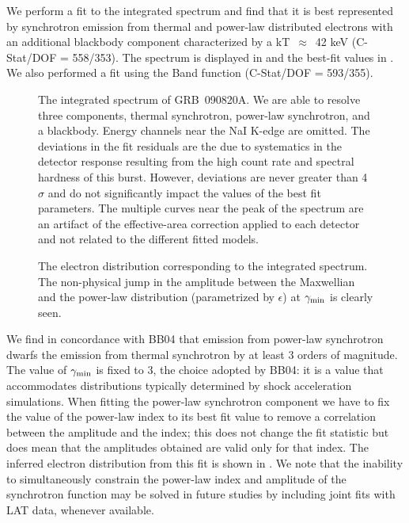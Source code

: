 We perform a fit to the integrated spectrum and find that it is best
represented by synchrotron emission from thermal and power-law
distributed electrons with an additional blackbody component
characterized by a kT~$\approx$~42 keV (C-Stat/DOF = 558/353). The
 spectrum is displayed in 
and the best-fit values in . We also performed
a fit using the Band function (C-Stat/DOF = 593/355).
\begin{figure}[h]
\caption{The integrated
  spectrum of GRB~090820A. We are able to resolve three
  components, thermal synchrotron, power-law synchrotron, and a
  blackbody. Energy channels near the NaI K-edge are omitted. The
  deviations in the fit residuals are the due to systematics in the
  detector response resulting from the high count rate and spectral
  hardness of this burst. However, deviations are never greater than
  4$\sigma$ and do not significantly impact the values of the best fit
  parameters. The multiple curves near the peak of the spectrum are an
  artifact of the effective-area correction applied to each detector
  and not related to the different fitted models.}
\label{fig:figure2}
\end{figure}



\begin{figure}
\label{fig:figure3}
\caption{The electron distribution corresponding to the integrated spectrum. The non-physical jump in the amplitude between the Maxwellian and the power-law distribution (parametrized by $\epsilon$) at $\gamma_{\rm min}$ is clearly seen.}
\end{figure}



We find in concordance with BB04 that emission from power-law
synchrotron dwarfs the emission from thermal synchrotron by at least 3
orders of magnitude. The value of $\gamma_{\rm min}$ is fixed to 3, the
choice adopted by BB04: it is a value that accommodates distributions
typically determined by shock acceleration simulations.  When fitting
the power-law synchrotron component we have to fix the value of the
power-law index to its best fit value to remove a correlation between
the amplitude and the index; this does not change the fit statistic
but does mean that the amplitudes obtained are valid only for that
index. The inferred electron distribution from this fit is shown in
. We note that the inability to simultaneously
constrain the power-law index and amplitude of the synchrotron
function may be solved in future studies by including joint fits with
LAT data, whenever available.



